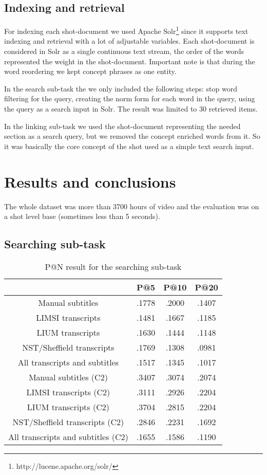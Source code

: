 \documentclass{acm_proc_article-me}
\begin{document}
\subsection{Indexing and retrieval}

For indexing each shot-document we used Apache Solr\footnote{http://lucene.apache.org/solr/} since it supports text indexing and retrieval with a lot of adjustable variables. Each shot-document is considered in Solr as a single continuous text stream, the order of the words represented the weight in the shot-document. Important note is that during the word reordering we kept concept phrases as one entity.

In the search sub-task the we only included the following steps: stop word filtering for the query, creating the norm form for each word in the query, using the query as a search input in Solr. The result was limited to 30 retrieved items.

In the linking sub-task we used the shot-document representing the needed section as a search query, but we removed the concept enriched words from it. So it was basically the core concept of the shot used as a simple text search input.

\section{Results and conclusions}

The whole dataset was more than 3700 hours of video and the evaluation was on a shot level base (sometimes less than 5 seconds).

\subsection{Searching sub-task}

\begin{table}[h]
\begin{tabular}{|c|c|c|c|}
	\hline 
	& P@5 & P@10 & P@20\tabularnewline
	\hline 
	\hline 
	Manual subtitles & .1778 & .2000 & .1407\tabularnewline
	\hline 
	LIMSI transcripts & .1481 & .1667 & .1185\tabularnewline
	\hline 
	LIUM transcripts & .1630 & .1444 & .1148\tabularnewline
	\hline 
	NST/Sheffield transcripts& .1769 & .1308 & .0981\tabularnewline
	\hline 
	All transcripts and subtitles & .1517 & .1345 & .1017\tabularnewline
	\hline 
	Manual subtitles (C2) & .3407 & .3074 & .2074\tabularnewline
	\hline 
	LIMSI transcripts (C2) & .3111 & .2926 & .2204\tabularnewline
	\hline 
	LIUM transcripts (C2) & .3704 & .2815 & .2204\tabularnewline
	\hline 
	NST/Sheffield transcripts (C2) & .2846 & .2231 & .1692\tabularnewline	
	\hline 
	All transcripts and subtitles (C2) & .1655 & .1586 & .1190\tabularnewline	
	\hline 
\end{tabular}
\caption{P@N result for the searching sub-task}
\end{table}
\end{document}
